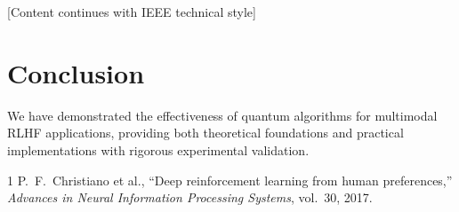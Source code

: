 \documentclass[conference]{IEEEtran}
\begin{document}
[Content continues with IEEE technical style]

\section{Conclusion}
We have demonstrated the effectiveness of quantum algorithms for multimodal RLHF applications, providing both theoretical foundations and practical implementations with rigorous experimental validation.

\begin{thebibliography}{1}
P.~F.~Christiano et al., ``Deep reinforcement learning from human preferences,'' \emph{Advances in Neural Information Processing Systems}, vol.~30, 2017.
\end{thebibliography}
\end{document}

